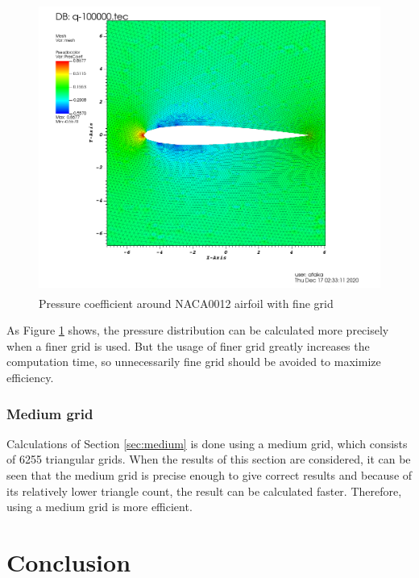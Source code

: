 \documentclass[letterpaper,12pt]{article}
\begin{document}
\vspace{1cm}

\begin{figure} [!h]
	\centering
	\includegraphics[height = 9.5cm]{graph/fine/fine_pressure0000.png}
	\caption{Pressure coefficient around NACA0012 airfoil with fine grid}
    \label{fig:airfoilfinepressure}
\end{figure}

\vspace{1cm}

As Figure \ref{fig:airfoilfinepressure} shows, the pressure distribution can be 
calculated more precisely when a finer grid is used. But the usage of finer grid
greatly increases the computation time, so unnecessarily fine grid should be avoided 
to maximize efficiency.

\subsubsection{Medium grid}

Calculations of Section \ref{sec:medium} is done using a medium grid, which consists of 
6255 triangular grids. When the results of this section are considered, it can be seen that
the medium grid is precise enough to give correct results and because of its relatively lower triangle count, the result
can be calculated faster. Therefore, using a medium grid is more efficient.

\newpage

\section{Conclusion}
\end{document}
